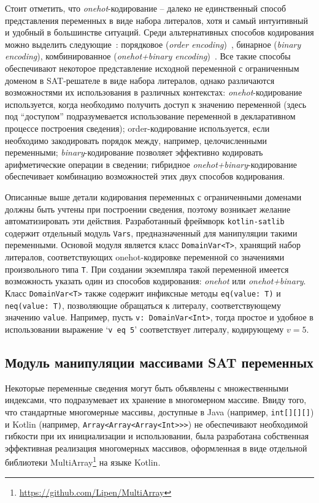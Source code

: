 Стоит отметить, что \textit{onehot}-кодирование \--- далеко не единственный способ представления переменных в виде набора литералов, хотя и самый интуитивный и удобный в большинстве ситуаций.
Среди альтернативных способов кодирования можно выделить следующие~\cite{sat-encodings}: порядковое (\textit{order encoding})~\cite{order-encoding}, бинарное (\textit{binary encoding}), комбинированное (\textit{onehot+binary encoding})~\cite{sat-encodings}.
Все такие способы обеспечивают некоторое представление исходной переменной с ограниченным доменом в SAT-решателе в виде набора литералов, однако различаются возможностями их использования в различных контекстах: \textit{onehot}-кодирование используется, когда необходимо получить доступ к значению переменной (здесь под \enquote{доступом} подразумевается использование переменной в декларативном процессе построения сведения); order-кодирование используется, если необходимо закодировать порядок между, например, целочисленными переменными; \textit{binary}-кодирование позволяет эффективно кодировать арифметические операции в сведении; гибридное \textit{onehot+binary}-кодирование обеспечивает комбинацию возможностей этих двух способов кодирования.

Описанные выше детали кодирования переменных с ограниченными доменами должны быть учтены при построении сведения, поэтому возникает желание автоматизировать эти действия.
Разработанный фреймворк \texttt{kotlin-satlib} содержит отдельный модуль \texttt{Vars}, предназначенный для манипуляции такими переменными.
Основой модуля является класс \texttt{DomainVar<T>}, хранящий набор литералов, соответствующих onehot-кодировке переменной со значениями произвольного типа \texttt{T}.
При создании экземпляра такой переменной имеется возможность указать один из способов кодирования: \textit{onehot} или \textit{onehot+binary}.
Класс \texttt{DomainVar<T>} также содержит инфиксные методы \texttt{eq(value:~T)} и \texttt{neq(value:~T)}, позволяющие обращаться к литералу, соответствующему значению \texttt{value}.
Например, пусть \texttt{v:~DomainVar<Int>}, тогда простое и удобное в использовании выражение `\texttt{v~eq~5}' соответствует литералу, кодирующему $v = 5$.

\subsection{Модуль манипуляции массивами SAT переменных}

Некоторые переменные сведения могут быть объявлены с множественными индексами, что подразумевает их хранение в многомерном массиве.
Ввиду того, что стандартные многомерные массивы, доступные в Java (например, \texttt{int[][][]}) и Kotlin (например, \texttt{Array<\-Array<\-Array<Int>>>}) не обеспечивают необходимой гибкости при их инициализации и использовании, была разработана собственная эффективная реализация многомерных массивов, оформленная в виде отдельной библиотеки MultiArray\footnote{\url{https://github.com/Lipen/MultiArray}} на языке Kotlin.

